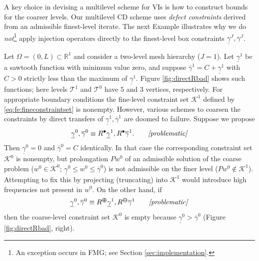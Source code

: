 \documentclass[review,hidelinks,onefignum,onetabnum,final]{siamart220329}  %
\newcommand{\RR}{\mathbb{R}}
\newcommand{\maxR}{R^{\bm{\oplus}}}
\newcommand{\minR}{R^{\bm{\ominus}}}
\newcommand{\iR}{R^{\bullet}}
\begin{document}
A key choice in devising a multilevel scheme for VIs is how to construct bounds for the coarser levels.  Our multilevel CD scheme uses \emph{defect constraints} \cite{GraeserKornhuber2009} derived from an admissible finest-level iterate.  The next Example illustrates why we do \emph{not}\footnote{An exception occurs in FMG; see Section \ref{sec:implementation}.} apply injection operators directly to the finest-level box constraints $\underline{\gamma}^J,\overline{\gamma}^J$.

\begin{example}  \label{ex:directRbad}  
Let $\Omega = (0,L) \subset \RR^1$ and consider a two-level mesh hierarchy ($J=1$).  Let $\underline{\gamma}^1$ be a sawtooth function with minimum value zero, and suppose $\overline{\gamma}^1=C+\underline{\gamma}^1$ with $C>0$ strictly less than the maximum of $\underline{\gamma}^1$.  Figure \ref{fig:directRbad} shows such functions; here levels $\mathcal{T}^1$ and $\mathcal{T}^0$ have $5$ and $3$ vertices, respectively.  For appropriate boundary conditions the fine-level constraint set $\mathcal{K}^1$ defined by \eqref{eq:fe:fineconstraintset} is nonempty.  However, various schemes to coarsen the constraints by direct transfers of $\underline{\gamma}^1,\overline{\gamma}^1$ are doomed to failure.  Suppose we propose
\begin{equation}
    \label{eq:fe:badstandard}
    \underline{\gamma}^0, \overline{\gamma}^0 \equiv \iR \underline{\gamma}^1, \iR \overline{\gamma}^1. \qquad \text{\emph{[problematic]}}
\end{equation}
Then $\underline{\gamma}^0=0$ and $\overline{\gamma}^0=C$ identically.  In that case the corresponding constraint set $\mathcal{K}^0$ is nonempty, but prolongation $Pw^0$ of an admissible solution of the coarse problem ($w^0\in\mathcal{K}^0$; $\underline{\gamma}^0 \le w^0 \le \overline{\gamma}^0$) is not admissible on the finer level ($Pw^0 \notin \mathcal{K}^1$).  Attempting to fix this by projecting (truncating) into $\mathcal{K}^1$ would introduce high frequencies not present in $w^0$.  On the other hand, if
\begin{equation}
    \label{eq:fe:badmonotone}
    \underline{\gamma}^0, \overline{\gamma}^0 \equiv \maxR \underline{\gamma}^1, \minR \overline{\gamma}^1 \qquad \text{\emph{[problematic]}}
\end{equation}
then the coarse-level constraint set $\mathcal{K}^0$ is empty because $\underline{\gamma}^0 > \overline{\gamma}^0$ (Figure \ref{fig:directRbad}, right).
\end{example}
\end{document}
